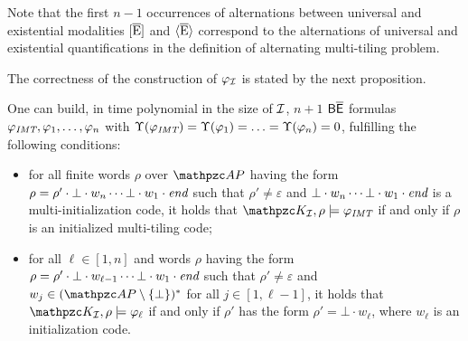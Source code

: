 Note that the first $n-1$ occurrences of alternations between universal and existential modalities  $\operatorname{\mathopen[ \overline{E} \mathclose]}$ and $\operatorname{\langle \overline{E}\rangle}$ correspond to the alternations of universal and existential quantifications in the definition of alternating multi-tiling problem. 

The correctness of the construction of $\varphi_{\mathcal{I}}$ is stated by the next proposition.
%
\begin{proposition}\label{prop:FormulasForMultiTilingCodes}  One can build, in  time polynomial in the size of $\mathcal{I}$,
$n+1$ $\mathsf{B\overline{E}}$ formulas $\varphi_{\textit{IMT}},\varphi_1,\ldots,\varphi_n$ with $\Upsilon(\varphi_{\textit{IMT}})=\Upsilon(\varphi_1) =\ldots =\Upsilon(\varphi_n)= 0$, fulfilling the following conditions:
\begin{itemize}
  \item for all finite words $\rho$ over $\Prop$ having the form $\rho =\rho' \cdot \bot \cdot w_n  \cdots  \bot \cdot w_1\cdot \textit{end}$ such that $\rho'\neq \varepsilon$ and
  $\bot \cdot w_n  \cdots  \bot \cdot w_1\cdot \textit{end}$ is a multi-initialization code, it holds that $\Ku_\Instance,\rho\models\varphi_\IMT$ if and only if
  $\rho$ is an initialized multi-tiling code;
  \item for all $\ell\in [1,n]$ and words $\rho$ having the form $\rho=\rho'\cdot \bot \cdot w_{\ell-1} \cdots \bot \cdot w_1\cdot \textit{end}$ such that
 $\rho'\neq \varepsilon$ and $w_j\in (\Prop\setminus \{\bot\})^{*}$ for all $j\in [1,\ell-1]$, it holds that $\Ku_\Instance,\rho\models\varphi_\ell$ if and only if
$\rho'$ has the form  $\rho'=\bot\cdot w_\ell$, where $w_\ell$ is an initialization code.
\end{itemize}
\end{proposition}
